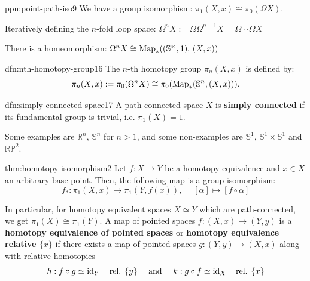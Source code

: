 \documentclass[landscape, 8pt]{extarticle}
\begin{document}
\begin{multicols*}{3}
\vspace{-7pt}
\begin{ppn}{ppn:point-path-iso}{9}
	\vspace{-2pt}
	We have a group isomorphism: $\pi_{1}(X, x) \cong \pi_{0}(\Omega X).$

	Iteratively defining the $n$-fold loop space: $\Omega^{n}X := \Omega \Omega^{n-1}X = \Omega \cdot \cdot \Omega X$

	There is a homeomorphism: $\Omega^{n}X \cong \operatorname{Map}_{\ast}((\mathbb{S^{n}}, 1),\,(X, x))$
\end{ppn}

\begin{dfn}{dfn:nth-homotopy-group}{16}
	\vspace{-2pt}
	The $n$-th homotopy group $\pi_{n}(X, x)$ is defined by:
	\[\pi_{n}(X, x) := \pi_{0}(\Omega^{n} X) \cong \pi_{0}(\operatorname{Map}_{\ast}(\mathbb{S}^{n}, (X, x))).\]
\end{dfn}

\vspace{-7pt}
\begin{dfn}{dfn:simply-connected-space}{17}
	\vspace{-2pt}
	A path-connected space $X$ is \textbf{simply connected} if its fundamental group is trivial, i.e. $\pi_{1}(X) = 1$.
	\par\vspace{-4pt}
	\tcbline
	Some examples are $\mathbb{R}^{n}$, $\mathbb{S}^{n}$ for $n > 1$, and some non-examples are $\mathbb{S}^{1}$, $\mathbb{S}^{1} \times \mathbb{S}^{1}$ and $\mathbb{RP}^{2}$.
\end{dfn}

\vspace{-7pt}
\begin{thm}{thm:homotopy-isomorphism}{2}
	\vspace{-2pt}
	Let $f : X \to Y$ be a homotopy equivalence and $x\in X$ an arbitrary base point. Then, the following map is a group isomorphism:
	\vspace{-2pt}
	\[f_{\ast} : \pi_{1}(X, x) \to \pi_{1}(Y, f(x)),\;\quad [\alpha] \mapsto [f \circ \alpha]\]
	\par\vspace{-2pt}
	In particular, for homotopy equivalent spaces $X \simeq Y$ which are path-connected, we get $\pi_{1}(X) \cong \pi_{1}(Y)$.
	\tcbline
	A map of pointed spaces $f : (X, x) \to (Y, y)$ is a \textbf{homotopy equivalence of pointed spaces} or \textbf{homotopy equivalence relative $\{x\}$} if there exists a map of pointed spaces $g : (Y, y) \to (X, x)$ along with relative homotopies
	\[h : f \circ g \simeq \operatorname{id}_{Y} \quad \text{rel. } \{y\} \quad \text{ and } \quad k : g \circ f \simeq \operatorname{id}_{X} \quad \text{rel. } \{x\}\]
\end{thm}


\end{multicols*}
\end{document}
